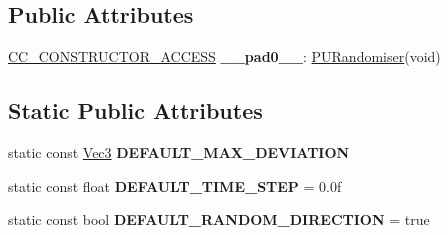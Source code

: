 \subsection*{Public Attributes}
\begin{DoxyCompactItemize}
\item 
\mbox{\label{classPURandomiser_a38a598e257654394d220ce9a62a35470}} 
\hyperlink{_2cocos2d_2cocos_2base_2ccConfig_8h_a25ef1314f97c35a2ed3d029b0ead6da0}{C\+C\+\_\+\+C\+O\+N\+S\+T\+R\+U\+C\+T\+O\+R\+\_\+\+A\+C\+C\+E\+SS} {\bfseries \+\_\+\+\_\+pad0\+\_\+\+\_\+}\+: \hyperlink{classPURandomiser}{P\+U\+Randomiser}(void)
\end{DoxyCompactItemize}
\subsection*{Static Public Attributes}
\begin{DoxyCompactItemize}
\item 
\mbox{\label{classPURandomiser_ad9ba5e343c3c35c21afaec38928d462d}} 
static const \hyperlink{classVec3}{Vec3} {\bfseries D\+E\+F\+A\+U\+L\+T\+\_\+\+M\+A\+X\+\_\+\+D\+E\+V\+I\+A\+T\+I\+ON}
\item 
\mbox{\label{classPURandomiser_abb2d8c043ea146f7631533901e25507f}} 
static const float {\bfseries D\+E\+F\+A\+U\+L\+T\+\_\+\+T\+I\+M\+E\+\_\+\+S\+T\+EP} = 0.\+0f
\item 
\mbox{\label{classPURandomiser_a57e976d9f7fcc33a3df843b6f9f5bc36}} 
static const bool {\bfseries D\+E\+F\+A\+U\+L\+T\+\_\+\+R\+A\+N\+D\+O\+M\+\_\+\+D\+I\+R\+E\+C\+T\+I\+ON} = true
\end{DoxyCompactItemize}
